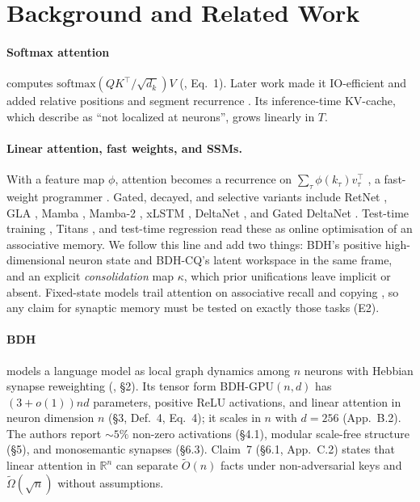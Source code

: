 \documentclass[10pt]{article}
\theoremstyle{remark}
\newcommand{\R}{\mathbb{R}}
\begin{document}
\section{Background and Related Work}
\label{sec:related}

\paragraph{Softmax attention} computes $\mathrm{softmax}(QK^\top/\sqrt{d_k})V$ (\citealp{vaswani2017attention},
Eq.~1). Later work made it IO-efficient \citep{dao2022flashattention} and added relative positions
\citep{su2024roformer,press2022alibi} and segment recurrence \citep{dai2019transformerxl}. Its inference-time
KV-cache, which \citet[Table~3]{kosowski2025bdh} describe as ``not localized at neurons'', grows linearly in $T$.

\paragraph{Linear attention, fast weights, and SSMs.} With a feature map $\phi$, attention becomes a recurrence on
$\sum_\tau \phi(k_\tau)v_\tau^\top$ \citep{katharopoulos2020transformers,choromanski2021performer}, a fast-weight
programmer \citep{ba2016fastweights,schlag2021linear}. Gated, decayed, and selective variants include RetNet
\citep{sun2023retnet}, GLA \citep{yang2024gla}, Mamba \citep{gu2023mamba}, Mamba-2 \citep{dao2024ssd}, xLSTM
\citep{beck2024xlstm}, DeltaNet \citep{yang2024deltanet}, and Gated DeltaNet \citep{yang2025gateddelta}.
Test-time training \citep{sun2024ttt}, Titans \citep{behrouz2025titans}, and test-time regression
\citep{wang2025testtimeregression} read these as online optimisation of an associative memory. We follow this line
and add two things: BDH's positive high-dimensional neuron state and BDH-CQ's latent workspace in the same frame,
and an explicit \emph{consolidation} map $\kappa$, which prior unifications leave implicit or absent. Fixed-state
models trail attention on associative recall and copying \citep{arora2023zoology,jelassi2024repeat}, so any claim
for synaptic memory must be tested on exactly those tasks (E2).

\paragraph{BDH} models a language model as local graph dynamics among $n$ neurons with Hebbian synapse reweighting
(\citealp{kosowski2025bdh}, \S2). Its tensor form BDH-GPU$(n,d)$ has $(3+o(1))nd$ parameters, positive ReLU
activations, and linear attention in neuron dimension $n$ (\S3, Def.~4, Eq.~4); it scales in $n$ with $d=256$
(App.~B.2). The authors report ${\sim}5\%$ non-zero activations (\S4.1), modular scale-free structure (\S5), and
monosemantic synapses (\S6.3). Claim~7 (\S6.1, App.~C.2) states that linear attention in $\R^n$ can separate
$\tilde O(n)$ facts under non-adversarial keys and $\tilde\Omega(\sqrt n)$ without assumptions.
\end{document}
